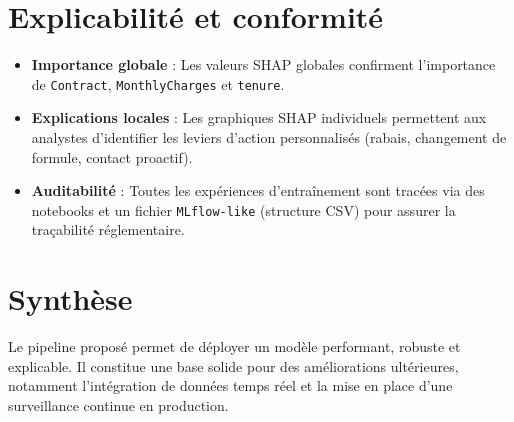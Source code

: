 \section{Explicabilit\'e et conformit\'e}
\begin{itemize}
    \item \textbf{Importance globale} : Les valeurs SHAP globales confirment l'importance de \texttt{Contract}, \texttt{MonthlyCharges} et \texttt{tenure}.
    \item \textbf{Explications locales} : Les graphiques SHAP individuels permettent aux analystes d'identifier les leviers d'action personnalis\'es (rabais, changement de formule, contact proactif).
    \item \textbf{Auditabilit\'e} : Toutes les exp\'eriences d'entra\^inement sont trac\'ees via des notebooks et un fichier \texttt{MLflow-like} (structure CSV) pour assurer la tra\c{c}abilit\'e r\'eglementaire.
\end{itemize}

\section{Synth\`ese}
Le pipeline propos\'e permet de d\'eployer un mod\`ele performant, robuste et explicable. Il constitue une base solide pour des am\'eliorations ult\'erieures, notamment l'int\'egration de donn\'ees temps r\'eel et la mise en place d'une surveillance continue en production.
